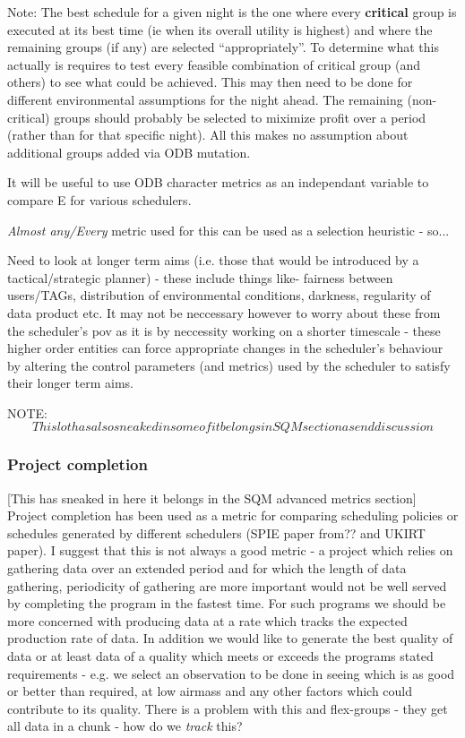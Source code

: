 Note: The best schedule for a given night is the one where every {\bf critical} group is executed at its best time (ie when its overall utility is highest) and where the remaining groups (if any) are selected ``appropriately''. To determine what this actually is requires to test every feasible combination of critical group (and others) to see what could be achieved. This may then need to be done for different environmental assumptions for the night ahead. The remaining (non-critical) groups should probably be selected to miximize profit over a period (rather than for that specific night). All this makes no assumption about additional groups added via ODB mutation.


It will be useful to use ODB character metrics as an independant variable to compare E for various schedulers.

\emph{Almost any/Every} metric used for this can be used as a selection heuristic - so...


Need to look at longer term aims (i.e. those that would be introduced by a tactical/strategic planner) - these include things like- fairness between users/TAGs, distribution of environmental conditions, darkness, regularity of data product etc. It may not be neccessary however to worry about these from the scheduler's pov as it is by neccessity working on a shorter timescale - these higher order entities can force appropriate changes in the scheduler's behaviour by altering the control parameters (and metrics) used by the scheduler to satisfy their longer term aims.  
 




%
NOTE:\[This lot has also sneaked in some of it belongs in SQM section as end discussion\]
\subsubsection{Project completion}
[This has sneaked in here it belongs in the SQM advanced metrics section]
Project completion has been used as a metric for comparing scheduling policies or schedules generated by different schedulers (SPIE paper from?? and UKIRT paper). I suggest that this is not always a good metric - a project which relies on gathering data over an extended period and for which the length of data gathering, periodicity of gathering are more important would not be well served by completing the program in the fastest time. For such programs we should be more concerned with producing data at a rate which tracks the expected production rate of data. In addition we would like to generate the best quality of data or at least data of a quality which meets or exceeds the programs stated requirements - e.g. we select an observation to be done in seeing which is as good or better than required, at low airmass and any other factors which could contribute to its quality. There is a problem with this and flex-groups - they get all data in a chunk - how do we \emph{track} this?

